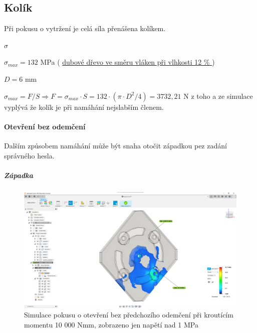 \newpage

\subsection{Kolík}
Při pokusu o vytržení je celá síla přenášena kolíkem.

\begin{table}[h]
    \centering
    \caption{Tabulka použitých symbolu pro napětí v kolíku v tahu}
    \label{tab:M3_symboly_kolik}
\end{table}

 $ \sigma $     

 $ \sigma_{max} = 132  $ MPa    ( \href{https://is.mendelu.cz/eknihovna/opory/zobraz_cast.pl?fit_w=1;cast=9190}{dubové dřevo ve směru vláken při vlhkosti 12 \% }) %

$D = 6$ mm %

 \(\sigma_{max} = F/S \Rightarrow F = \sigma_{max} \cdot S = 132 \cdot (\pi \cdot D^2/4) = 3 732,21 \) N  z toho a ze simulace vyplývá že kolík je při namáhání nejslabším členem.

\paragraph{Otevření bez odemčení}
Dalším způsobem namáhání může být snaha otočit západkou pez zadání správného hesla.

\subparagraph{Západka}

\begin{figure}[htbp]
    \centering
    \includegraphics[width=\textwidth]{kapitoly/obrazky/M3/simulace/odolnost_proti_nasilnemu_odemceni_10Nm.png}
    \caption{Simulace pokusu o otevření bez předchozího odemčení při kroutícím momentu 10 000 Nmm, zobrazeno jen napětí nad 1 MPa}
    \label{fig:M3-simulace-vytrzeni}
\end{figure}

